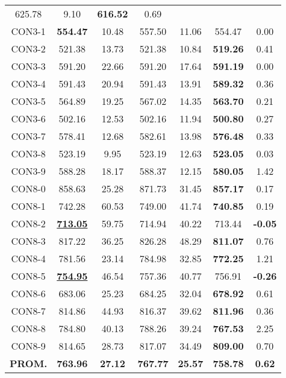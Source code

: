 \begin{table}[ht]
\begin{tabular}{c c c c c c c}
625.78 & 9.10 & \bf{616.52} & 
0.69\\CON3-1 & \bf{554.47} & 10.48 & 
557.50 & 11.06 & 554.47 & 0.00\\
CON3-2 & 521.38 & 13.73 & 
521.38 & 10.84 & \bf{519.26} & 
0.41\\CON3-3 & 591.20 & 22.66 & 
591.20 & 17.64 & \bf{591.19} & 
0.00\\CON3-4 & 591.43 & 20.94 & 
591.43 & 13.91 & \bf{589.32} & 
0.36\\CON3-5 & 564.89 & 19.25 & 
567.02 & 14.35 & \bf{563.70} & 
0.21\\CON3-6 & 502.16 & 12.53 & 
502.16 & 11.94 & \bf{500.80} & 
0.27\\CON3-7 & 578.41 & 12.68 & 
582.61 & 13.98 & \bf{576.48} & 
0.33\\CON3-8 & 523.19 & 9.95 & 
523.19 & 12.63 & \bf{523.05} & 
0.03\\CON3-9 & 588.28 & 18.17 & 
588.37 & 12.15 & \bf{580.05} & 
1.42\\CON8-0 & 858.63 & 25.28 & 
871.73 & 31.45 & \bf{857.17} & 
0.17\\CON8-1 & 742.28 & 60.53 & 
749.00 & 41.74 & \bf{740.85} & 
0.19\\CON8-2 & \bf{\underline{713.05}} & 59.75 & 
714.94 & 40.22 & 713.44 & 
\bf{-0.05}\\CON8-3 & 817.22 & 36.25 & 
826.28 & 48.29 & \bf{811.07} & 
0.76\\CON8-4 & 781.56 & 23.14 & 
784.98 & 32.85 & \bf{772.25} & 
1.21\\CON8-5 & \bf{\underline{754.95}} & 46.54 & 
757.36 & 40.77 & 756.91 & 
\bf{-0.26}\\CON8-6 & 683.06 & 25.23 & 
684.25 & 32.04 & \bf{678.92} & 
0.61\\CON8-7 & 814.86 & 44.93 & 
816.37 & 39.62 & \bf{811.96} & 
0.36\\CON8-8 & 784.80 & 40.13 & 
788.26 & 39.24 & \bf{767.53} & 
2.25\\CON8-9 & 814.65 & 28.73 & 
817.07 & 34.49 & \bf{809.00} & 
0.70\\\bf{PROM.} & 
\bf{763.96} & \bf{27.12} & \bf{767.77} & \bf{25.57} & \bf{758.78} & \bf{0.62}\\[1ex]\hline
\end{tabular}
\label{table:nonlin}
\end{table} \clearpage
